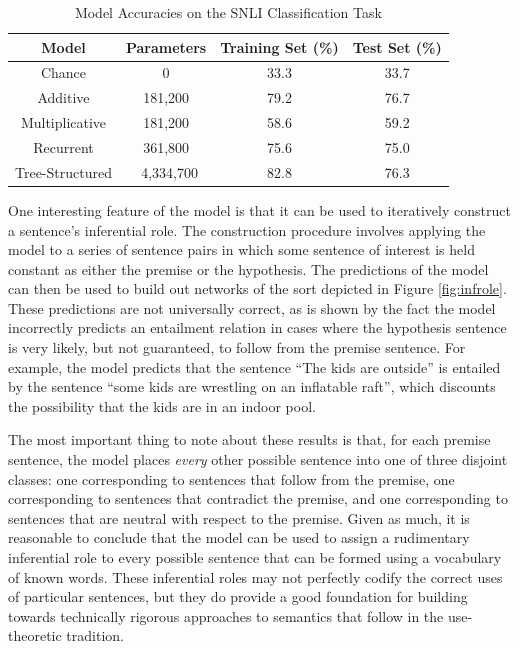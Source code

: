 \begin{table}[!t]
\begin{center} 
\caption{Model Accuracies on the SNLI Classification Task} 
\label{accuracy} 
\vskip 0.12in
\begin{tabular}{c c c c} 
\hline
Model & Parameters &  Training Set (\%)  & Test Set (\%)\\
\hline
Chance  & 0 & 33.3 &  33.7 \\
Additive & 181,200 & 79.2 & 76.7 \\ 
Multiplicative & 181,200 & 58.6 & 59.2 \\
Recurrent & 361,800 &  75.6 & 75.0  \\
Tree-Structured &  4,334,700 &  82.8 & 76.3  \\
\hline
\end{tabular} 
\end{center} 
\end{table}

One interesting feature of the model is that it can be used to iteratively construct a sentence's inferential role. The construction procedure involves applying the model to a series of sentence pairs in which some sentence of interest is held constant as either the premise or the hypothesis. The predictions of the model can then be used to build out networks of the sort depicted in Figure \ref{fig:infrole}. These predictions are not universally correct, as is shown by the fact the model incorrectly predicts an entailment relation in cases where the hypothesis sentence is very likely, but not guaranteed, to follow from the premise sentence. For example, the model predicts that the sentence ``The kids are outside'' is entailed by the sentence ``some kids are wrestling on an inflatable raft'', which discounts the possibility that the kids are in an indoor pool.

The most important thing to note about these results is that, for each premise sentence, the model places \textit{every} other possible sentence into one of three disjoint classes: one corresponding to sentences that follow from the premise, one corresponding to sentences that contradict the premise, and one corresponding to sentences that are neutral with respect to the premise. Given as much, it is reasonable to conclude that the model can be used to assign a rudimentary inferential role to every possible sentence that can be formed using a vocabulary of known words. These inferential roles may not perfectly codify the correct uses of particular sentences, but they do provide a good foundation for building towards technically rigorous approaches to semantics that follow in the use-theoretic tradition.  

